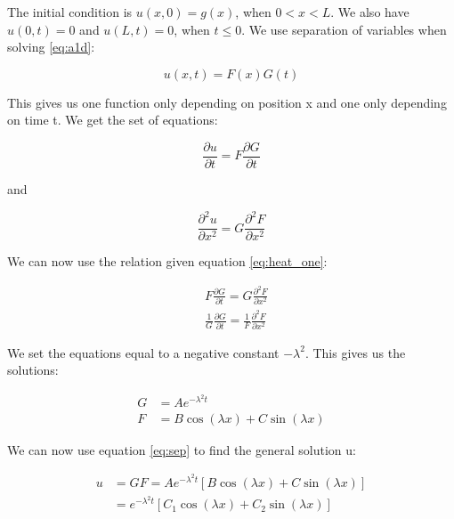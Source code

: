 \documentclass{article}
\begin{document}
The initial condition is $u(x,0)=g(x)$, when $0<x<L$. We also have $u(0,t)=0$ and $u(L,t)=0$, when $t\leq0$. We use separation of variables when solving \ref{eq:a1d}:

\begin{equation}
u(x,t) = F(x)G(t)
\label{eq:sep}
\end{equation}

This gives us one function only depending on position x and one only depending on time t. We get the set of equations:

\begin{equation*}
\frac{\partial u}{\partial t} = F \frac{\partial G}{\partial t}
\end{equation*}

and

\begin{equation*}
\frac{\partial^2 u}{\partial x^2} = G \frac{\partial^2 F}{\partial x^2}
\end{equation*}

We can now use the relation given equation \ref{eq:heat_one}:

\begin{equation}
\begin{split}
&F\frac{\partial G}{\partial t} = G \frac{\partial ^2 F}{\partial x^2}\\
&\frac{1}{G}\frac{\partial G}{\partial t} = \frac{1}{F} \frac{\partial^2 F}{\partial x^2}
\end{split}
\end{equation}

We set the equations equal to a negative constant $-\lambda^2$. This gives us the solutions:

\begin{equation*}
\begin{split}
G &= Ae^{-\lambda^2 t}\\
F &= B\cos{(\lambda x)} + C\sin{(\lambda x)}
\end{split}
\end{equation*} 

We can now use equation \ref{eq:sep} to find the general solution u:

\begin{equation}
\begin{split}
u &= GF = Ae^{-\lambda^2 t} [B\cos{(\lambda x)} + C\sin{(\lambda x)}]\\
&=e^{-\lambda^2 t} [C_1\cos{(\lambda x)} + C_2\sin{(\lambda x)}]
\end{split}
\end{equation}
\end{document}
